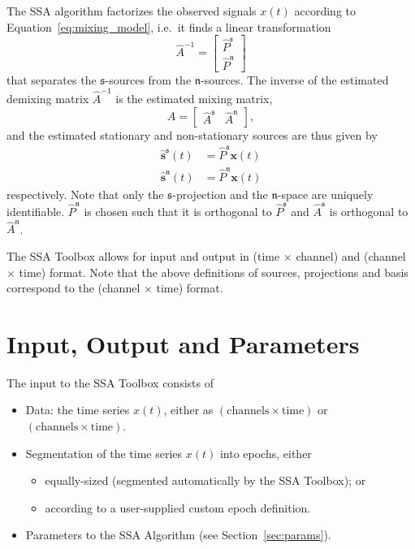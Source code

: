\documentclass{article}
\newcommand{\1}{\ensuremath{\mathds{1}}}
\newcommand{\s}{\ensuremath{\mathfrak{s}}}
\newcommand{\n}{\ensuremath{\mathfrak{n}}}
\newcommand{\0}{\ensuremath{0}}
\begin{document}
The SSA algorithm factorizes the observed signals $x(t)$ according to
Equation~\ref{eq:mixing_model}, i.e.~it finds a linear transformation
\begin{equation}
\label{eq:est_demixing}
  \hat{A}^{-1} = \begin{bmatrix} \hat{P}^{\s} \\ \hat{P}^{\n} \end{bmatrix}
\end{equation}
that separates the \s-sources from the \n-sources. The inverse of the estimated 
demixing matrix $\hat{A}^{-1}$ is the estimated mixing matrix, 
\begin{equation}
\label{eq:est_mixing}
 \hat{A} = \begin{bmatrix} \hat{A}^{\s} & \hat{A}^{\n} \end{bmatrix}, 
\end{equation}
and the estimated stationary and non-stationary sources are thus given by
\begin{align}
\label{eq:est_s_sources}
  \hat{\mathbf s}^{\s}(t) & = \hat{P}^{\s} {\mathbf x}(t) \\
\label{eq:est_n_sources}
  \hat{\mathbf s}^{\n}(t) & = \hat{P}^{\n} {\mathbf x}(t) 
\end{align}
respectively.
Note that only the $\s$-projection and the $\n$-space are uniquely identifiable.
$\hat P^{\n}$ is chosen such that it is orthogonal to $\hat P^{\s}$ and 
$\hat A^{\s}$ is orthogonal to $\hat A^{\n}$.

The SSA Toolbox allows for input and output in (time $\times$ channel) and 
(channel $\times$ time) format. Note that the above definitions of sources, 
projections and basis correspond to the (channel $\times$ time) format.

\section{Input, Output and Parameters}

The input to the SSA Toolbox consists of
\begin{itemize}
 \item Data: the time series $x(t)$, either as $(\text{channels} \times \text{time})$ or 
				$(\text{channels} \times \text{time})$.

 \item Segmentation of the time series $x(t)$ into epochs, either
	\begin{itemize}
	  \item equally-sized (segmented automatically by the SSA Toolbox); or 
	  \item according to a user-supplied custom epoch definition. 
	\end{itemize}

 \item Parameters to the SSA Algorithm (see Section~\ref{sec:params}).
\end{itemize}
\end{document}
